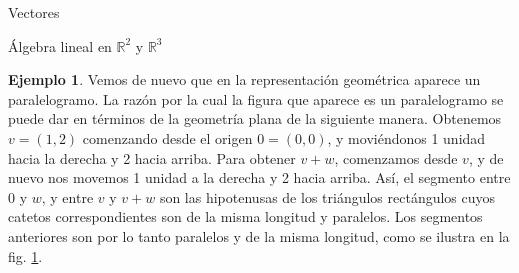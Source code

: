 \documentclass[a4paper,12pt,twoside,spanish,reqno]{amsbook}
\theoremstyle{definition}
\newtheorem{ejemplo}{Ejemplo}[section]
\theoremstyle{remark}
\newcommand{\R}{\mathbb R}
\begin{document}
\begin{chapter}{Vectores}
\begin{section}{Álgebra lineal en $\R^2$ y $\R^3$}
\begin{ejemplo}
        Vemos de nuevo que en la representación geométrica aparece un paralelogramo. La razón por la cual la figura que aparece es un paralelogramo se puede dar en 	términos de la geometría plana de la siguiente manera. Obtenemos $v = (1, 2)$ comenzando desde el origen $0 = (0, 0)$, y moviéndonos 1 unidad hacia la derecha y 2 hacia arriba. Para obtener $v+w$, comenzamos desde $v$, y de nuevo nos movemos 1 unidad a la derecha y 2 hacia arriba. Así, el segmento entre 0 y $w$, y entre $v$ y $v+w$ son las hipotenusas de los triángulos rectángulos cuyos catetos  correspondientes son de la misma longitud y paralelos. Los segmentos anteriores son por lo tanto paralelos y de la misma longitud, como se ilustra en la fig. \ref{fig-ley-del-paralelogramo-3}.
        \begin{figure}[h]
            \caption{\;}\label{fig-ley-del-paralelogramo-3}
        \end{figure}
    \end{ejemplo}
    

\end{section}
\end{chapter}
\end{document}
